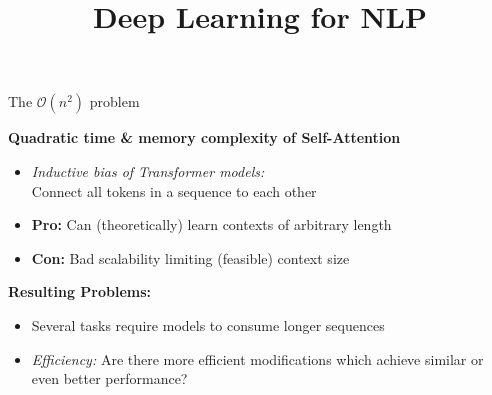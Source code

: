 \documentclass[11pt,compress,t,notes=noshow, xcolor=table]{beamer}
\title{Deep Learning for NLP}
\begin{document}


\begin{frame}{The $\mathcal{O}(n^2)$ problem}

\vfill

\textbf{Quadratic time \& memory complexity of Self-Attention}

\begin{itemize}
	\item \textit{Inductive bias of Transformer models:}\\
				Connect all tokens in a sequence to each other
	\item \textbf{Pro:} Can (theoretically) learn contexts of arbitrary length
	\item \textbf{Con:} Bad scalability limiting (feasible) context size
\end{itemize}

\vspace{.3cm}

\textbf{Resulting Problems:}

\begin{itemize}
	\item Several tasks require models to consume longer sequences
	\item \textit{Efficiency:} Are there more efficient modifications which achieve similar or even better performance? 
\end{itemize}
	
\vfill

\end{frame}

\end{document}
